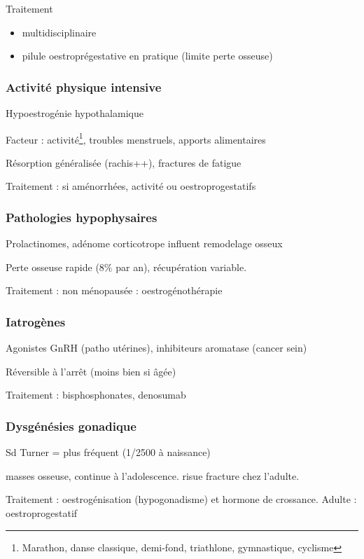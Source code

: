 \documentclass[11pt]{article}
\begin{document}
Traitement 
\begin{itemize}
\item multidisciplinaire
\item pilule oestroprégestative en pratique (limite perte osseuse)
\end{itemize}

\subsubsection{Activité physique intensive}
\label{sec:org858721a}
Hypoestrogénie hypothalamique

Facteur : activité\footnote{Marathon, danse classique, demi-fond, triathlone, gymnastique, cyclisme}, troubles menstruels, apports alimentaires

Résorption généralisée (rachis++), \inc fractures de fatigue

Traitement : si aménorrhées, \dec activité ou oestroprogestatifs

\subsubsection{Pathologies hypophysaires}
\label{sec:orgbc3f535}
Prolactinomes, adénome corticotrope influent remodelage osseux

Perte osseuse rapide (8\% par an), récupération variable.

Traitement : \female non ménopausée : oestrogénothérapie

\subsubsection{Iatrogènes}
\label{sec:org974b6c7}
Agonistes GnRH (patho utérines), inhibiteurs aromatase (cancer sein)

Réversible à l'arrêt (moins bien si âgée)

Traitement : bisphosphonates, denosumab

\subsubsection{Dysgénésies gonadique}
\label{sec:org9b9fc12}
Sd Turner = plus fréquent (1/2500 à naissance)

\dec masses osseuse, continue à l'adolescence. \inc risue fracture chez
l'adulte.

Traitement : oestrogénisation (hypogonadisme) et hormone de crossance. Adulte :
oestroprogestatif
\end{document}
